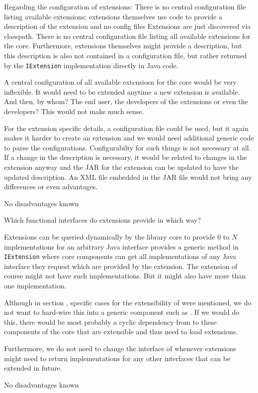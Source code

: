 Regarding the configuration of extensions:
{%
There is no central configuration file listing available extensions; extensions themselves use code to provide a description of the extension and no config files
}
{%
Extensions are just discovered via classpath. There is no central configuration file listing all available extensions for the \LibName{} core. Furthermore, extensions themselves might provide a description, but this description is also not contained in a configuration file, but rather returned by the \texttt{IExtension} implementation directly in Java code.
}
{%
A central configuration of all available extensiosn for the \LibName{} core would be very inflexible. It would need to be extended anytime a new extension is available. And then, by whom? The end user, the developers of the extensions or even the \LibName{} developers? This would not make much sense.

For the extension specific details, a configuration file could be used, but it again makes it harder to create an extension and we would need additional generic code to parse the configurations. Configurabilty for such things is not necessary at all. If a change in the description is necessary, it would be related to changes in the extension anyway and the JAR for the extension can be updated to have the updated description. An XML file embedded in the JAR file would not bring any differences or even advantages.
}
{%
No disadvantages known
}

Which functional interfaces do extensions provide in which way?

{%
Extensions can be queried dynamically by the library core to provide 0 to $N$ implementations for an arbitrary Java interface
}
{%
\COMPextensionManagement{} provides a generic method in \texttt{IExtension} where \LibName{} core components can get all implementations of any Java interface they request which are provided by the extension. The extension of course might not have such implementations. But it might also have more than one implementation.
}
{%
Although in section , specific cases for the extensibility of \LibName{} were mentioned, we do not want to hard-wire this into a generic component such as \COMPextensionManagement{}. If we would do this, there would be most probably a cyclic dependency from \COMPextensionManagement{} to these components of the \LibName{} core that are extensible and thus need to load extensions.

Furthermore, we do not need to change the interface of \COMPextensionManagement{} whenever extensions might need to return implementations for any other interfaces that can be extended in future.
}
{%
No disadvantages known
}

